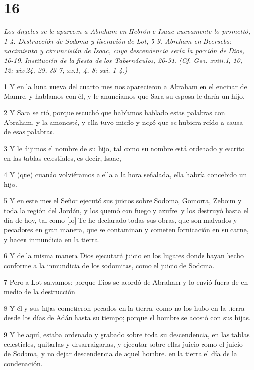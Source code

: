 \chapter{16}

\par \textit{Los ángeles se le aparecen a Abraham en Hebrón e Isaac nuevamente lo prometió, 1-4. Destrucción de Sodoma y liberación de Lot, 5-9. Abraham en Beerseba: nacimiento y circuncisión de Isaac, cuya descendencia sería la porción de Dios, 10-19. Institución de la fiesta de los Tabernáculos, 20-31. (Cf. Gen. xviii.1, 10, 12; xix.24, 29, 33-7; xx.1, 4, 8; xxi. 1-4.)}

\par 1 Y en la luna nueva del cuarto mes nos aparecieron a Abraham en el encinar de Mamre, y hablamos con él, y le anunciamos que Sara su esposa le daría un hijo.
\par 2 Y Sara se rió, porque escuchó que habíamos hablado estas palabras con Abraham, y la amonesté, y ella tuvo miedo y negó que se hubiera reído a causa de esas palabras.
\par 3 Y le dijimos el nombre de su hijo, tal como su nombre está ordenado y escrito en las tablas celestiales, es decir, Isaac,
\par 4 Y (que) cuando volviéramos a ella a la hora señalada, ella habría concebido un hijo.
\par 5 Y en este mes el Señor ejecutó sus juicios sobre Sodoma, Gomorra, Zeboim y toda la región del Jordán, y los quemó con fuego y azufre, y los destruyó hasta el día de hoy, tal como [lo] Te he declarado todas sus obras, que son malvados y pecadores en gran manera, que se contaminan y cometen fornicación en su carne, y hacen inmundicia en la tierra.
\par 6 Y de la misma manera Dios ejecutará juicio en los lugares donde hayan hecho conforme a la inmundicia de los sodomitas, como el juicio de Sodoma.
\par 7 Pero a Lot salvamos; porque Dios se acordó de Abraham y lo envió fuera de en medio de la destrucción.
\par 8 Y él y sus hijas cometieron pecados en la tierra, como no los hubo en la tierra desde los días de Adán hasta su tiempo; porque el hombre se acostó con sus hijas.
\par 9 Y he aquí, estaba ordenado y grabado sobre toda su descendencia, en las tablas celestiales, quitarlas y desarraigarlas, y ejecutar sobre ellas juicio como el juicio de Sodoma, y ​​no dejar descendencia de aquel hombre. en la tierra el día de la condenación.
